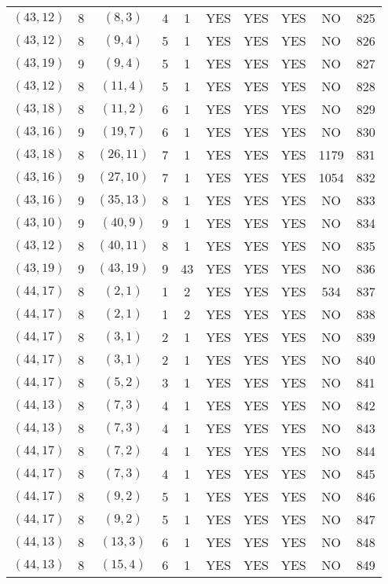 \begin{longtable}{|c|c|c|c|c|c|c|c|c|c|}
$(43, 12)$ & 8 & $(8, 3)$ & 4 & 1 & YES & YES & YES & NO & 825\\
$(43, 12)$ & 8 & $(9, 4)$ & 5 & 1 & YES & YES & YES & NO & 826\\
$(43, 19)$ & 9 & $(9, 4)$ & 5 & 1 & YES & YES & YES & NO & 827\\
$(43, 12)$ & 8 & $(11, 4)$ & 5 & 1 & YES & YES & YES & NO & 828\\
$(43, 18)$ & 8 & $(11, 2)$ & 6 & 1 & YES & YES & YES & NO & 829\\
$(43, 16)$ & 9 & $(19, 7)$ & 6 & 1 & YES & YES & YES & NO & 830\\
$(43, 18)$ & 8 & $(26, 11)$ & 7 & 1 & YES & YES & YES & 1179 & 831\\
$(43, 16)$ & 9 & $(27, 10)$ & 7 & 1 & YES & YES & YES & 1054 & 832\\
$(43, 16)$ & 9 & $(35, 13)$ & 8 & 1 & YES & YES & YES & NO & 833\\
$(43, 10)$ & 9 & $(40, 9)$ & 9 & 1 & YES & YES & YES & NO & 834\\
$(43, 12)$ & 8 & $(40, 11)$ & 8 & 1 & YES & YES & YES & NO & 835\\
$(43, 19)$ & 9 & $(43, 19)$ & 9 & 43 & YES & YES & YES & NO & 836\\
$(44, 17)$ & 8 & $(2, 1)$ & 1 & 2 & YES & YES & YES & 534 & 837\\
$(44, 17)$ & 8 & $(2, 1)$ & 1 & 2 & YES & YES & YES & NO & 838\\
$(44, 17)$ & 8 & $(3, 1)$ & 2 & 1 & YES & YES & YES & NO & 839\\
$(44, 17)$ & 8 & $(3, 1)$ & 2 & 1 & YES & YES & YES & NO & 840\\
$(44, 17)$ & 8 & $(5, 2)$ & 3 & 1 & YES & YES & YES & NO & 841\\
$(44, 13)$ & 8 & $(7, 3)$ & 4 & 1 & YES & YES & YES & NO & 842\\
$(44, 13)$ & 8 & $(7, 3)$ & 4 & 1 & YES & YES & YES & NO & 843\\
$(44, 17)$ & 8 & $(7, 2)$ & 4 & 1 & YES & YES & YES & NO & 844\\
$(44, 17)$ & 8 & $(7, 3)$ & 4 & 1 & YES & YES & YES & NO & 845\\
$(44, 17)$ & 8 & $(9, 2)$ & 5 & 1 & YES & YES & YES & NO & 846\\
$(44, 17)$ & 8 & $(9, 2)$ & 5 & 1 & YES & YES & YES & NO & 847\\
$(44, 13)$ & 8 & $(13, 3)$ & 6 & 1 & YES & YES & YES & NO & 848\\
$(44, 13)$ & 8 & $(15, 4)$ & 6 & 1 & YES & YES & YES & NO & 849\\

\end{longtable}
